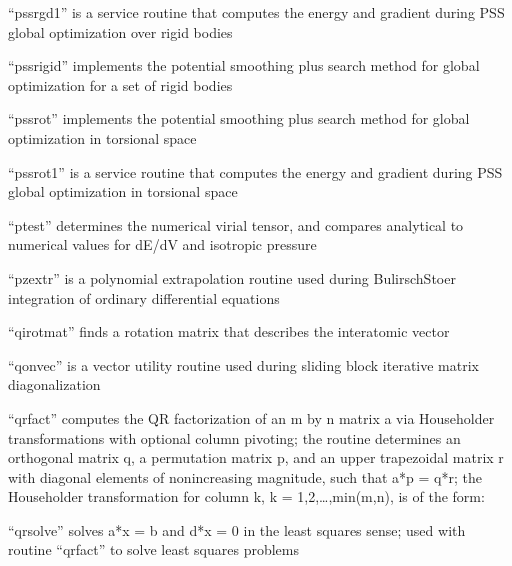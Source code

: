 \documentclass[letterpaper,11pt,english]{sphinxmanual}
\begin{document}
“pssrgd1” is a service routine that computes the energy and
gradient during PSS global optimization over rigid bodies


“pssrigid” implements the potential smoothing plus search method
for global optimization for a set of rigid bodies


“pssrot” implements the potential smoothing plus search method
for global optimization in torsional space


“pssrot1” is a service routine that computes the energy and
gradient during PSS global optimization in torsional space



“ptest” determines the numerical virial tensor, and compares
analytical to numerical values for dE/dV and isotropic pressure



“pzextr” is a polynomial extrapolation routine used during
Bulirsch\sphinxhyphen{}Stoer integration of ordinary differential equations


“qirotmat” finds a rotation matrix that describes the
interatomic vector


“qonvec” is a vector utility routine used during sliding
block iterative matrix diagonalization


“qrfact” computes the QR factorization of an m by n matrix a
via Householder transformations with optional column pivoting;
the routine determines an orthogonal matrix q, a permutation
matrix p, and an upper trapezoidal matrix r with diagonal
elements of nonincreasing magnitude, such that a*p = q*r; the
Householder transformation for column k, k = 1,2,…,min(m,n),
is of the form:


“qrsolve” solves a*x = b and d*x = 0 in the least squares sense;
used with routine “qrfact” to solve least squares problems
\end{document}
